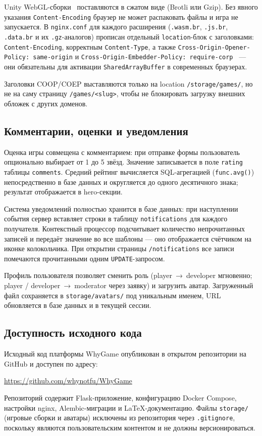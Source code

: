 Unity WebGL-сборки~\cite{unity_webgl} поставляются в сжатом виде (Brotli или Gzip).
Без явного указания \texttt{Content-Encoding} браузер не может распаковать файлы
и игра не запускается. В \texttt{nginx.conf} для каждого расширения
(\texttt{.wasm.br}, \texttt{.js.br}, \texttt{.data.br} и их \texttt{.gz}-аналогов)
прописан отдельный \texttt{location}-блок с заголовками:
\texttt{Content-Encoding}, корректным \texttt{Content-Type}, а также
\texttt{Cross-Origin-Opener-Policy: same-origin} и
\texttt{Cross-Origin-Embedder-Policy: require-corp}~\cite{mdn_coep} --- они
обязательны для активации \texttt{SharedArrayBuffer} в современных браузерах.

Заголовки COOP/COEP выставляются только на location \texttt{/storage/games/},
но не на саму страницу \texttt{/games/<slug>}, чтобы не блокировать загрузку
внешних обложек с других доменов.

\subsection{Комментарии, оценки и уведомления}

Оценка игры совмещена с комментарием: при отправке формы пользователь
опционально выбирает от 1 до 5 звёзд. Значение записывается в поле
\texttt{rating} таблицы \texttt{comments}. Средний рейтинг вычисляется
SQL-агрегацией (\texttt{func.avg()}) непосредственно в базе данных и
округляется до одного десятичного знака; результат отображается в hero-секции.

Система уведомлений полностью хранится в базе данных: при наступлении события
сервер вставляет строки в таблицу \texttt{notifications} для каждого получателя.
Контекстный процессор подсчитывает количество непрочитанных записей и передаёт
значение во все шаблоны --- оно отображается счётчиком на иконке колокольчика.
При открытии страницы \texttt{/notifications} все записи помечаются прочитанными
одним \texttt{UPDATE}-запросом.

Профиль пользователя позволяет сменить роль (player~→~developer мгновенно;
player / developer~→~moderator через заявку) и загрузить аватар. Загруженный
файл сохраняется в \texttt{storage/avatars/} под уникальным именем, URL
обновляется в базе данных и в текущей сессии.

\subsection{Доступность исходного кода}

Исходный код платформы WhyGame опубликован в открытом репозитории на GitHub
и доступен по адресу:

\begin{center}
    \url{https://github.com/whynotfu/WhyGame}
\end{center}

Репозиторий содержит Flask-приложение, конфигурацию Docker Compose, настройки
nginx, Alembic-миграции и LaTeX-документацию. Файлы \texttt{storage/}
(игровые сборки и аватары) исключены из репозитория через \texttt{.gitignore},
поскольку являются пользовательским контентом и не должны версионироваться.
